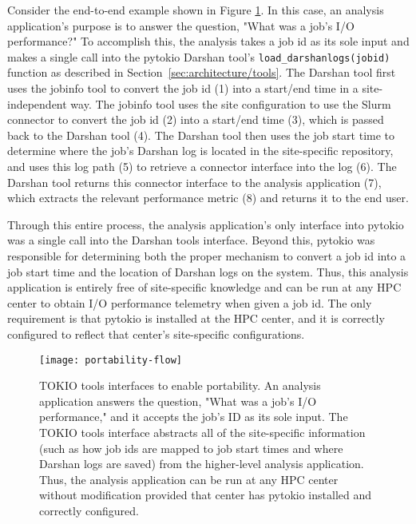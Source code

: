 Consider the end-to-end example shown in Figure \ref{fig:portability-flow}.  
In this case, an analysis application's purpose is to answer the question, "What was a job's I/O performance?"
To accomplish this, the analysis takes a job id as its sole input and makes a single call into the pytokio Darshan tool's \texttt{load\_darshanlogs(jobid)} function as described in Section~\ref{sec:architecture/tools}.
The Darshan tool first uses the jobinfo tool to convert the job id (1) into a start/end time in a site-independent way.
The jobinfo tool uses the site configuration to use the Slurm connector to convert the job id (2) into a start/end time (3), which is passed back to the Darshan tool (4).
The Darshan tool then uses the job start time to determine where the job's Darshan log is located in the site-specific repository, and uses this log path (5) to retrieve a connector interface into the log (6).
The Darshan tool returns this connector interface to the analysis application (7), which extracts the relevant performance metric (8) and returns it to the end user.

Through this entire process, the analysis application's only interface into pytokio was a single call into the Darshan tools interface.
Beyond this, pytokio was responsible for determining both the proper mechanism to convert a job id into a job start time and the location of Darshan logs on the system.
Thus, this analysis application is entirely free of site-specific knowledge and can be run at any HPC center to obtain I/O performance telemetry when given a job id.
The only requirement is that pytokio is installed at the HPC center, and it is correctly configured to reflect that center's site-specific configurations.

\begin{figure}
    \centering
    \texttt{[image: portability-flow]}
    \caption{TOKIO tools interfaces to enable portability.
    An analysis application answers the question, "What was a job's I/O performance," and it accepts the job's ID as its sole input.
    The TOKIO tools interface abstracts all of the site-specific information (such as how job ids are mapped to job start times and where Darshan logs are saved) from the higher-level analysis application.
    Thus, the analysis application can be run at any HPC center without modification provided that center has pytokio installed and correctly configured.
    }
    \label{fig:portability-flow}
    \vspace{-.2in}
\end{figure}